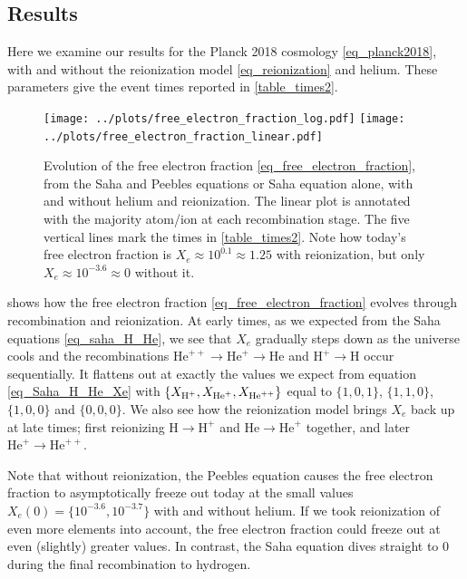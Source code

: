 \documentclass[10pt,a4paper]{article}
\begin{document}
\subsection{Results}

Here we examine our results for the Planck 2018 cosmology \eqref{eq_planck2018},
with and without the reionization model \eqref{eq_reionization} and helium.
These parameters give the event times reported in \cref{table_times2}.

\begin{figure}[ht!]
	\centering
	\texttt{[image: ../plots/free\_electron\_fraction\_log.pdf]}
	\texttt{[image: ../plots/free\_electron\_fraction\_linear.pdf]}
	\caption{%
		Evolution of the free electron fraction \eqref{eq_free_electron_fraction},
		from the Saha and Peebles equations or Saha equation alone,
		with and without helium and reionization.
		The linear plot is annotated with the majority atom/ion at each recombination stage.
		The five vertical lines mark the times in \cref{table_times2}.
		Note how today's free electron fraction is
		$X_e \approx 10^{0.1} \approx 1.25$ with reionization,
		but only $X_e \approx 10^{-3.6} \approx 0$ without it.
	}
	\label{fig_free_electron_fraction}
\end{figure}

 shows how the free electron fraction \eqref{eq_free_electron_fraction} evolves through recombination and reionization.
At early times, as we expected from the Saha equations \eqref{eq_saha_H_He},
we see that $X_e$ gradually steps down as the universe cools and the recombinations $\text{He}^{++} \rightarrow \text{He}^+ \rightarrow \text{He}$ and $\text{H}^+ \rightarrow \text{H}$ occur sequentially.
It flattens out at exactly the values we expect from equation \eqref{eq_Saha_H_He_Xe} with $\{X_{\text{H}^+}, X_{\text{He}^+}, X_{\text{He}^{++}}\}$ equal to $\{1,0,1\}$, $\{1,1,0\}$, $\{1,0,0\}$ and $\{0,0,0\}$.
We also see how the reionization model brings $X_e$ back up at late times;
first reionizing $\text{H} \rightarrow \text{H}^+$ and $\text{He} \rightarrow \text{He}^+$ together,
and later $\text{He}^{+} \rightarrow \text{He}^{++}$.

Note that without reionization, the Peebles equation causes the free electron fraction to asymptotically freeze out today at the small values $X_e(0) = \{10^{-3.6}, 10^{-3.7}\}$ with and without helium.
If we took reionization of even more elements into account, the free electron fraction could freeze out at even (slightly) greater values.
In contrast, the Saha equation dives straight to $0$ during the final recombination to hydrogen.
\end{document}
